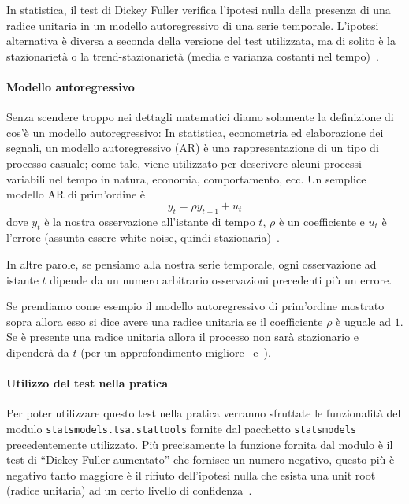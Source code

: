 In statistica, il test di Dickey Fuller verifica l'ipotesi nulla della presenza
di una radice unitaria in un modello autoregressivo di una serie temporale. 
L'ipotesi alternativa è diversa a seconda della versione del test utilizzata, 
ma di solito è la stazionarietà o la trend-stazionarietà (media e varianza costanti nel tempo)~\cite{wiki:dickey_fuller}.

\paragraph{Modello autoregressivo}
Senza scendere troppo nei dettagli matematici diamo solamente la definizione di 
cos'è un modello autoregressivo: 
In statistica, econometria ed elaborazione dei segnali, 
un modello autoregressivo (AR) è una rappresentazione di 
un tipo di processo casuale; come tale, viene utilizzato 
per descrivere alcuni processi variabili nel tempo in natura, 
economia, comportamento, ecc.
Un semplice modello AR di prim'ordine è
\[ y_t = \rho y_{t-1} + u_t \]
dove $y_t$ è la nostra osservazione all'istante di tempo $t$, $\rho$ è un coefficiente
e $u_t$ è l'errore (assunta essere white noise, quindi stazionaria)~\cite{wiki:dickey_fuller}.

In altre parole, se pensiamo alla nostra serie temporale, ogni osservazione ad istante $t$
dipende da un numero arbitrario osservazioni precedenti più un errore.

Se prendiamo come esempio il modello autoregressivo di prim'ordine mostrato sopra allora
esso si dice avere una radice unitaria se il coefficiente $\rho$ è uguale ad $1$.
Se è presente una radice unitaria allora il processo non sarà stazionario e dipenderà da $t$
(per un approfondimento migliore~\cite{wiki:unit_root} e~\cite{wiki:dickey_fuller}).

\paragraph{Utilizzo del test nella pratica}
Per poter utilizzare questo test nella pratica verranno sfruttate le 
funzionalità del modulo \texttt{statsmodels.tsa.stattools} fornite dal 
pacchetto \texttt{statsmodels} precedentemente utilizzato. Più
precisamente la funzione fornita dal modulo è il test di 
``Dickey-Fuller aumentato'' che fornisce un numero negativo, questo più 
è negativo tanto maggiore è il rifiuto dell'ipotesi nulla che esista una unit root (radice unitaria)
ad un certo livello di confidenza~\cite{wiki:aug_dickey_fuller}.

